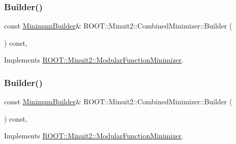 \mbox{\label{classROOT_1_1Minuit2_1_1CombinedMinimizer_a73befc9c0bdfe8c9f09638505772c5ed}} 
\subsubsection{\texorpdfstring{Builder()}{Builder()}\hspace{0.1cm}{\footnotesize\ttfamily [2/3]}}
{\footnotesize\ttfamily const \mbox{\hyperlink{classROOT_1_1Minuit2_1_1MinimumBuilder}{Minimum\+Builder}}\& R\+O\+O\+T\+::\+Minuit2\+::\+Combined\+Minimizer\+::\+Builder (\begin{DoxyParamCaption}{ }\end{DoxyParamCaption}) const\hspace{0.3cm}{\ttfamily [inline]}, {\ttfamily [virtual]}}



Implements \mbox{\hyperlink{classROOT_1_1Minuit2_1_1ModularFunctionMinimizer_a13e98551cf14e927c61e1e34ecf8ba8b}{R\+O\+O\+T\+::\+Minuit2\+::\+Modular\+Function\+Minimizer}}.

\mbox{\label{classROOT_1_1Minuit2_1_1CombinedMinimizer_a73befc9c0bdfe8c9f09638505772c5ed}} 
\subsubsection{\texorpdfstring{Builder()}{Builder()}\hspace{0.1cm}{\footnotesize\ttfamily [3/3]}}
{\footnotesize\ttfamily const \mbox{\hyperlink{classROOT_1_1Minuit2_1_1MinimumBuilder}{Minimum\+Builder}}\& R\+O\+O\+T\+::\+Minuit2\+::\+Combined\+Minimizer\+::\+Builder (\begin{DoxyParamCaption}{ }\end{DoxyParamCaption}) const\hspace{0.3cm}{\ttfamily [inline]}, {\ttfamily [virtual]}}



Implements \mbox{\hyperlink{classROOT_1_1Minuit2_1_1ModularFunctionMinimizer_a13e98551cf14e927c61e1e34ecf8ba8b}{R\+O\+O\+T\+::\+Minuit2\+::\+Modular\+Function\+Minimizer}}.

